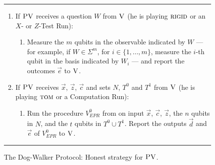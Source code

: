 \documentclass{toc}
\newcommand{\rigid}{\textsc{rigid}}
\newcommand{\tom}{\textsc{tom}}
\newcommand{\ver}{\textsc{V}}
\newcommand{\pv}{\textsc{PV}}
\begin{document}
\begin{figure}[H]
\rule[1ex]{\textwidth}{0.5pt}
\vspace{-20pt}
\begin{enumerate}
  \item If $\pv$ receives a question ${W}$ from $\ver$ (he is playing $\rigid$ or an $X$- or $Z$-Test Run):
\begin{enumerate}
     \item[]  Measure the $m$ qubits in the observable indicated by $W$ --- for example, if $W\in \Sigma^m$, for $i\in \{1,\ldots,m\}$, measure the $i$-th qubit in the basis indicated by $W_i$ --- and report the outcomes $\vec{e}$ to $\ver$.
\end{enumerate}

  \item If $\pv$ receives $\vec{x}$, $\vec{z}$, $\vec{c}$ and sets $N$, $T^0$ and $T^1$ from $\ver$ (he is playing $\tom$ or a Computation Run):
\begin{enumerate}
	\item[] Run the procedure $V_{EPR}^0$ from  on input $\vec{x}$, $\vec{c}$, $\vec{z}$, the $n$ qubits in $N$, and the $t$ qubits in $T^0\cup T^1$. Report the outputs  $\vec{d}$ and $\vec{e}$ of $V_{EPR}^0$ to $\ver$.
\end{enumerate}
\end{enumerate}
\rule[2ex]{\textwidth}{0.5pt}\vspace{-.5cm}
\caption{The Dog-Walker Protocol: Honest strategy for $\pv$.}\label{fig:dogwalker-protocol-PV}
\end{figure}
\end{document}
